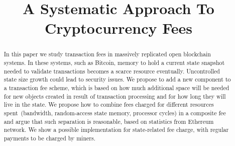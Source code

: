 \documentclass[]{llncs}   %
\newcommand{\authnote}[2]{\marginpar{\parbox{\marginparwidth}{\tiny %
  \textsf{#1 {\textcolor{blue}{notes: #2}}}}}%
  \textcolor{blue}{\textbf{\dag}}}
\newcommand{\authnote}[2]{
  \textsf{#1\textcolor{blue}{ #2}}}
\newcommand{\authnote}[2]{}
\newcommand{\knote}[1]{{\authnote{\textcolor{green}{Alex notes:}}{#1}}}
\begin{document}
\title{A Systematic Approach To Cryptocurrency Fees}


\maketitle

\begin{abstract}


In this paper we study transaction fees in massively replicated open
blockchain systems. In these systems, such as Bitcoin, memory to hold a current
state snapshot needed to validate transactions becomes a scarce resource 
eventually. Uncontrolled state size growth could lead
to security issues. 
We propose to add a new component to a transaction fee scheme, which is based on
how much additional space will be needed for new objects created in result of
transaction processing and for how long they will live in the state.
We propose how to combine fees charged for different resources spent~(bandwidth, random-access state memory, processor cycles)
in a composite fee and argue that such separation is reasonable, based on statistics from Ethereum network.
We show a possible implementation for state-related fee charge, with regular payments to be charged by miners.


\end{abstract}
\end{document}
